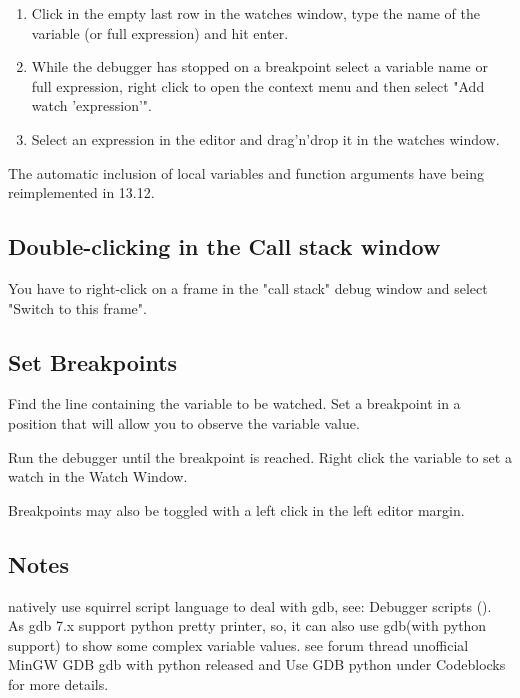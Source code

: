 \begin{enumerate}
\item Click in the empty last row in the watches window, type the name of the variable (or full expression) and hit enter.
\item While the debugger has stopped on a breakpoint select a variable name or full expression, right click to open the context menu and then select "Add watch 'expression'".
\item Select an expression in the editor and drag'n'drop it in the watches window.
\end{enumerate}

The automatic inclusion of local variables and function arguments have being reimplemented in 13.12. 

\subsection{Double-clicking in the Call stack window}

You have to right-click on a frame in the "call stack" debug window and select "Switch to this frame". 

\subsection{Set Breakpoints}

Find the line containing the variable to be watched. Set a breakpoint in a position that will allow you to observe the variable value.

Run the debugger until the breakpoint is reached. Right click the variable to set a watch in the Watch Window.

Breakpoints may also be toggled with a left click in the left editor margin. 

\subsection{Notes}

\codeblocks natively use squirrel script language to deal with gdb, see: Debugger scripts (). As gdb 7.x support python pretty printer, so, it can also use gdb(with python support) to show some complex variable values. see forum thread unofficial MinGW GDB gdb with python released and Use GDB python under Codeblocks for more details.

